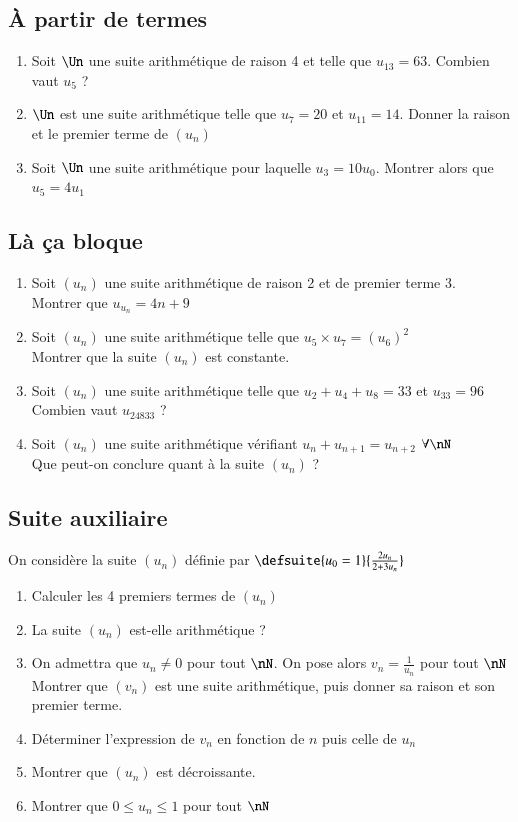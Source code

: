\documentclass[oneside,12pt]{article}          %
\begin{document}
\subsection{À partir de termes}
\begin{enumerate}
    \item Soit $\Un$ une suite arithmétique de raison 4 et telle que $u_{13}=63$. Combien vaut $u_{5}$ ? 
    \item $\Un$ est une suite arithmétique telle que $u_{7}=20$ et $u_{11}=14$. Donner la raison et le premier terme de $(u_n)$
	\item Soit $\Un$ une suite arithmétique pour laquelle $u_3=10u_0$. Montrer alors que $u_5=4u_1$
\end{enumerate}



\subsection{Là ça bloque}
\begin{enumerate}
	\item Soit $(u_n)$ une suite arithmétique de raison 2 et de premier terme 3.\\
	Montrer que $u_{u_n}=4n+9$
	\item Soit $(u_n)$ une suite arithmétique telle que $u_5\times u_7=(u_6)^2$\\
	Montrer que la suite $(u_n)$ est constante.
	\item Soit $(u_n)$ une suite arithmétique telle que $u_2+u_4+u_8=33$ et $u_{33}=96$\\
	Combien vaut $u_{24833}$ ?
	\item Soit $(u_n)$ une suite arithmétique vérifiant $u_n+u_{n+1}=u_{n+2}$ \quad $\forall\nN$\\
	Que peut-on conclure quant à la suite $(u_n)$ ?
\end{enumerate}



\subsection{Suite auxiliaire}
On considère la suite $(u_n)$ définie par $\defsuite{u_{0}=1}{\frac{2u_n}{2+3u_n}}$

\begin{enumerate}
    \item Calculer les 4 premiers termes de $(u_n)$
    \item La suite $(u_n)$ est-elle arithmétique ?
    \item On admettra que $u_n\neq 0$ pour tout $\nN$. On pose alors $v_{n}=\frac{1}{u_n}$ pour tout $\nN$
    Montrer que $(v_{n})$ est une suite arithmétique, puis donner sa raison et son premier terme.
    \item Déterminer l'expression de $v_{n}$ en fonction de $n$ puis celle de $u_n$
    \item Montrer que $(u_n)$ est décroissante.
    \item Montrer que $0\leq u_n\leq 1$ pour tout $\nN$
\end{enumerate}
\end{document}
